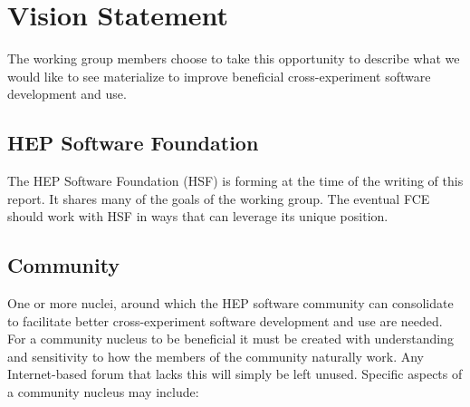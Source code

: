 \section{Vision Statement}

The working group members choose to take this opportunity to describe
what we would like to see materialize to improve beneficial
cross-experiment software development and use.

\subsection{HEP Software Foundation}

The HEP Software Foundation\cite{hsfwhitepaper} (HSF) is forming at
the time of the writing of this report.  It shares many of the goals
of the working group. The eventual FCE should work with HSF in ways
that can leverage its unique position.  

\subsection{Community}

One or more nuclei, around which the HEP software community can
consolidate to facilitate better cross-experiment software development
and use are needed.  For a community nucleus to be beneficial it must be created
with understanding and sensitivity to how the members of the community
naturally work.  Any Internet-based forum that lacks this will simply
be left unused.  Specific aspects of a community nucleus may include:


